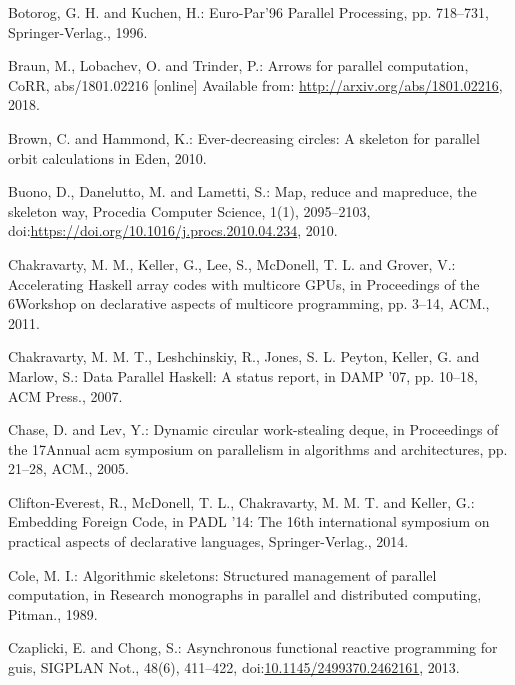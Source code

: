 \documentclass[paper=A4,twoside=true,openright,parskip=full,chapterprefix=true,headings=normal,bibliography=totoc,listof=totoc,titlepage=on,captions=tableabove,draft=false,british]{scrreprt}%
\begin{document}
\leavevmode\hypertarget{ref-botorog1996efficient}{}%
Botorog, G. H. and Kuchen, H.: Euro-Par'96 Parallel Processing, pp.
718--731, Springer-Verlag., 1996.

\leavevmode\hypertarget{ref-PArrowsPaper}{}%
Braun, M., Lobachev, O. and Trinder, P.: Arrows for parallel
computation, CoRR, abs/1801.02216 {[}online{]} Available from:
\url{http://arxiv.org/abs/1801.02216}, 2018.

\leavevmode\hypertarget{ref-brown2010ever}{}%
Brown, C. and Hammond, K.: Ever-decreasing circles: A skeleton for
parallel orbit calculations in Eden, 2010.

\leavevmode\hypertarget{ref-BUONO20102095}{}%
Buono, D., Danelutto, M. and Lametti, S.: Map, reduce and mapreduce, the
skeleton way, Procedia Computer Science, 1(1), 2095--2103,\linebreak
doi:\href{https://doi.org/https://doi.org/10.1016/j.procs.2010.04.234}{https://doi.org/10.1016/j.procs.2010.04.234},
2010.

\leavevmode\hypertarget{ref-Chakravarty:2011:AHA:1926354.1926358}{}%
Chakravarty, M. M., Keller, G., Lee, S., McDonell, T. L. and Grover, V.:
Accelerating Haskell array codes with multicore GPUs, in Proceedings of
the 6Workshop on declarative aspects of multicore programming, pp.
3--14, ACM., 2011.

\leavevmode\hypertarget{ref-Chakravarty2007}{}%
Chakravarty, M. M. T., Leshchinskiy, R., Jones, S. L. Peyton, Keller, G.
and Marlow, S.: Data Parallel Haskell: A status report, in DAMP '07, pp.
10--18, ACM Press., 2007.

\leavevmode\hypertarget{ref-Chase:2005:DCW:1073970.1073974}{}%
Chase, D. and Lev, Y.: Dynamic circular work-stealing deque, in
Proceedings of the 17Annual acm symposium on parallelism in algorithms
and architectures, pp. 21--28, ACM., 2005.

\leavevmode\hypertarget{ref-CMCK14}{}%
Clifton-Everest, R., McDonell, T. L., Chakravarty, M. M. T. and Keller,
G.: Embedding Foreign Code, in PADL '14: The 16th international
symposium on practical aspects of declarative languages,
Springer-Verlag., 2014.

\leavevmode\hypertarget{ref-Cole1989}{}%
Cole, M. I.: Algorithmic skeletons: Structured management of parallel
computation, in Research monographs in parallel and distributed
computing, Pitman., 1989.

\leavevmode\hypertarget{ref-Czaplicki:2013:AFR:2499370.2462161}{}%
Czaplicki, E. and Chong, S.: Asynchronous functional reactive
programming for guis, SIGPLAN Not., 48(6), 411--422,
doi:\href{https://doi.org/10.1145/2499370.2462161}{10.1145/2499370.2462161},
2013.
\end{document}
